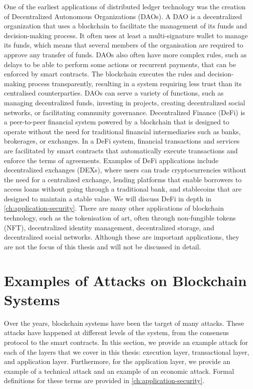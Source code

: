 One of the earliest applications of distributed ledger technology was the creation of Decentralized Autonomous Organizations (DAOs).
A DAO is a decentralized organization that uses a blockchain to facilitate the management of its funds and decision-making process.
It often uses at least a multi-signature wallet to manage its funds, which means that several members of the organisation are required to approve any transfer of funds.
DAOs also often have more complex rules, such as delays to be able to perform some actions or recurrent payments, that can be enforced by smart contracts.
The blockchain executes the rules and decision-making process transparently, resulting in a system requiring less trust than its centralised counterparties.
DAOs can serve a variety of functions, such as managing decentralized funds, investing in projects, creating decentralized social networks, or facilitating community governance.
Decentralized Finance (DeFi) is a peer-to-peer financial system powered by a blockchain that is designed to operate without the need for traditional financial intermediaries such as banks, brokerages, or exchanges.
In a DeFi system, financial transactions and services are facilitated by smart contracts that automatically execute transactions and enforce the terms of agreements.
Examples of DeFi applications include decentralized exchanges (DEXs), where users can trade cryptocurrencies without the need for a centralized exchange, lending platforms that enable borrowers to access loans without going through a traditional bank, and stablecoins that are designed to maintain a stable value.
We will discuss DeFi in depth in \autoref{ch:application-security}.
 There are many other applications of blockchain technology, such as the tokenisation of art, often through non-fungible tokens (NFT), decentralized identity management, decentralized storage, and decentralized social networks.
Although these are important applications, they are not the focus of this thesis and will not be discussed in detail.

\section{Examples of Attacks on Blockchain Systems}

Over the years, blockchain systems have been the target of many attacks.
These attacks have happened at different levels of the system, from the consensus protocol to the smart contracts.
In this section, we provide an example attack for each of the layers that we cover in this thesis: execution layer, transactional layer, and application layer.
Furthermore, for the application layer, we provide an example of a technical attack and an example of an economic attack.
Formal definitions for these terms are provided in \autoref{ch:application-security}.

